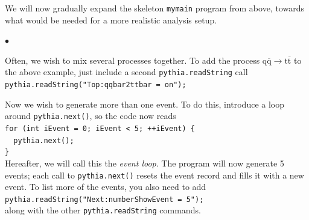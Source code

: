 \documentclass[12pt,a4paper]{article}
\newcommand{\q}{{\mathrm q}}
\renewcommand{\t}{{\mathrm t}}
\newcommand{\qbar}{\overline{\mathrm q}}
\newcommand{\tbar}{\overline{\mathrm t}}
\newenvironment{Itemize}{\begin{list}{$\bullet$}%
{\setlength{\topsep}{0.4mm}\setlength{\partopsep}{0.4mm}%
\setlength{\itemsep}{0.4mm}\setlength{\parsep}{0.4mm}}}%
{\end{list}}
\begin{document}
We will now gradually expand the skeleton \texttt{mymain} program from
above, towards what would be needed for a more realistic analysis setup.
\begin{Itemize}
\item Often, we wish to mix several processes together. 
To add the process $\q \qbar \to \t \tbar$ to the above example, 
just include a second \texttt{pythia.readString} call\\
\hspace*{10mm}\texttt{pythia.readString("Top:qqbar2ttbar = on");}
\item Now we wish to generate more than one event. To do this, introduce a
loop around \texttt{pythia.next()}, so the
code now reads\\
\hspace*{10mm}\texttt{for (int iEvent = 0; iEvent < 5; ++iEvent) \{ }\\
\hspace*{10mm}\texttt{~~pythia.next(); }\\
\hspace*{10mm}\texttt{\} }\\
Hereafter, we will call this the \textit{event loop}. The program will
now generate 5 events; each call to \texttt{pythia.next()} 
resets the event record and fills it with a new event. To list
more of the events, you also need to add\\
\hspace*{10mm}\texttt{pythia.readString("Next:numberShowEvent = 5");}\\
along with the other \texttt{pythia.readString} commands. 


\end{Itemize}
\end{document}
